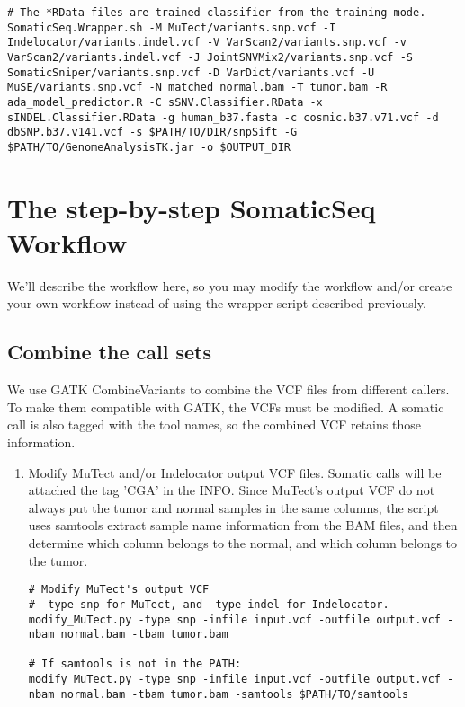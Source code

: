 \documentclass[10pt,letterpaper]{article}
\begin{document}
\begin{sloppypar}
\begin{lstlisting}
# The *RData files are trained classifier from the training mode.
SomaticSeq.Wrapper.sh -M MuTect/variants.snp.vcf -I Indelocator/variants.indel.vcf -V VarScan2/variants.snp.vcf -v VarScan2/variants.indel.vcf -J JointSNVMix2/variants.snp.vcf -S SomaticSniper/variants.snp.vcf -D VarDict/variants.vcf -U MuSE/variants.snp.vcf -N matched_normal.bam -T tumor.bam -R ada_model_predictor.R -C sSNV.Classifier.RData -x sINDEL.Classifier.RData -g human_b37.fasta -c cosmic.b37.v71.vcf -d dbSNP.b37.v141.vcf -s $PATH/TO/DIR/snpSift -G $PATH/TO/GenomeAnalysisTK.jar -o $OUTPUT_DIR
\end{lstlisting}



\section{The step-by-step SomaticSeq Workflow}

We'll describe the workflow here, so you may modify the workflow and/or create your own workflow instead of using the wrapper script described previously. 


\subsection{Combine the call sets}
	We use GATK CombineVariants to combine the VCF files from different callers. To make them compatible with GATK, the VCFs must be modified. A somatic call is also tagged with the tool names, so the combined VCF retains those information. 

\begin{enumerate}

\item 
Modify MuTect and/or Indelocator output VCF files. Somatic calls will be attached the tag 'CGA' in the INFO. 
Since MuTect's output VCF do not always put the tumor and normal samples in the same columns, the script uses samtools extract sample name information from the BAM files, and then determine which column belongs to the normal, and which column belongs to the tumor. 
	
\begin{lstlisting}
# Modify MuTect's output VCF
# -type snp for MuTect, and -type indel for Indelocator.
modify_MuTect.py -type snp -infile input.vcf -outfile output.vcf -nbam normal.bam -tbam tumor.bam
	
# If samtools is not in the PATH:
modify_MuTect.py -type snp -infile input.vcf -outfile output.vcf -nbam normal.bam -tbam tumor.bam -samtools $PATH/TO/samtools
\end{lstlisting}
	

\end{enumerate}
\end{sloppypar}
\end{document}
